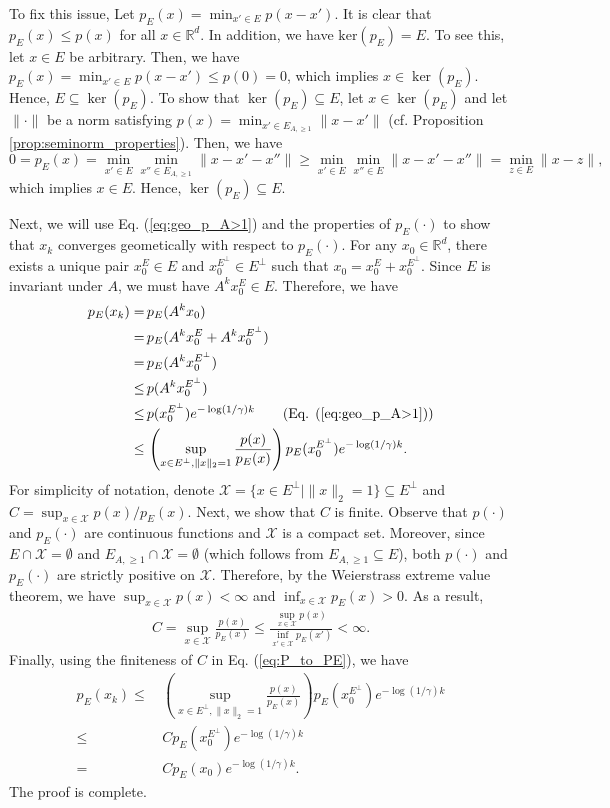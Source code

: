 \documentclass[11 pt]{article}
\begin{document}
\begin{itemize}
		To fix this issue,
		Let $p_E(x)=\min_{x'\in E}p(x-x')$. It is clear that $p_E(x)\leq p(x)$ for all $x\in\mathbb{R}^d$. In addition, we have $\text{ker}(p_E)=E$. To see this, let $ x \in E $ be arbitrary. Then, we have $ p_E(x) = \min_{x' \in E} p(x - x') \leq p(0) = 0 $, which implies $ x \in \ker(p_E) $. Hence, $ E \subseteq \ker(p_E) $.  To show that $ \ker(p_E) \subseteq E $, let $ x \in \ker(p_E) $ and let $ \|\cdot\| $ be a norm satisfying $ p(x) = \min_{x' \in E_{A,\geq 1}} \|x - x'\| $ (cf. Proposition \ref{prop:seminorm_properties}). Then, we have  
		\[
		0 = p_E(x) = \min_{x' \in E} \min_{x'' \in E_{A,\geq 1}} \|x - x' - x''\| \geq \min_{x' \in E} \min_{x'' \in E} \|x - x' - x''\| = \min_{z \in E} \|x - z\|,
		\]
		which implies $ x \in E $. Hence, $ \ker(p_E) \subseteq E $. 
		
		Next, we will use Eq. (\ref{eq:geo_p_A>1}) and the properties of $p_E(\cdot)$ to show that $x_k$ converges geometically with respect to $p_E(\cdot)$. For any $x_0\in\mathbb{R}^d$, there exists a unique pair $x_0^E\in E$ and $x_0^{E^\perp}\in E^\perp$ such that $x_0=x_0^E+x_0^{E^\perp}$. Since $E$ is invariant under $A$, we must have $A^kx_0^E\in E$. Therefore, we have
		\begin{align}
			p_E(x_k)=\,&p_E(A^kx_0)\nonumber\\
			=\,&p_E(A^kx_0^E+A^kx_0^{E^{\perp}})\nonumber\\
			=\,&p_E(A^kx_0^{E^{\perp}})\nonumber\\
			\leq\,& p(A^kx_0^{E^{\perp}})\nonumber\\
			\leq \,&p(x_0^{E^{\perp}})e^{-\log(1/\gamma)k}\tag{Eq. (\ref{eq:geo_p_A>1})}\nonumber\\
			\leq \,& \left(\sup_{x\in E^\perp,\|x\|_2=1}\frac{p(x)}{p_E(x)}\right) p_E(x_0^{E^{\perp}})e^{-\log(1/\gamma)k}.\label{eq:P_to_PE}
		\end{align}
		For simplicity of notation, denote $\mathcal{X}=\{x\in E^\perp\mid \|x\|_2=1\}\subseteq E^\perp$ and $C=\sup_{x\in \mathcal{X}}p(x)/p_E(x)$. Next, we show that $C$ is finite. Observe that $p(\cdot)$ and $p_E(\cdot)$ are continuous functions and $\mathcal{X}$ is a compact set. Moreover, since $E\cap \mathcal{X}=\emptyset$ and $E_{A,\geq 1}\cap \mathcal{X}=\emptyset$ (which follows from $E_{A,\geq 1}\subseteq E$), both $p(\cdot)$ and $p_E(\cdot)$ are strictly positive on $\mathcal{X}$. Therefore, by the Weierstrass extreme value theorem, we have $\sup_{x\in \mathcal{X}}p(x)<\infty$ and  $\inf_{x\in \mathcal{X}}p_E(x)>0$. As a result, 
		\begin{align*}
			C=\sup_{x\in \mathcal{X}}\frac{p(x)}{p_E(x)}\leq \frac{\sup_{x\in \mathcal{X}}p(x)}{\inf_{x'\in \mathcal{X}}p_E(x')}<\infty.
		\end{align*}
		Finally, using the finiteness of $C$ in Eq. (\ref{eq:P_to_PE}), we have
		\begin{align*}
			p_E(x_k)\leq\,& \left(\sup_{x\in E^\perp,\|x\|_2=1}\frac{p(x)}{p_E(x)}\right) p_E(x_0^{E^{\perp}})e^{-\log(1/\gamma)k}\\
			\leq\,& C p_E(x_0^{E^{\perp}})e^{-\log(1/\gamma)k}\\
			=\,& C p_E(x_0)e^{-\log(1/\gamma)k}.
		\end{align*}
		The proof is complete.
		

\end{itemize}
\end{document}
